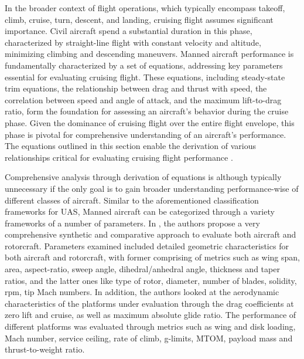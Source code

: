 \documentclass[english, 12pt, a4paper, elec, utf8, a-1b, online]{aaltothesis}
\begin{document}
In the broader context of flight operations, which typically encompass takeoff, climb, cruise, turn, descent, and landing, cruising flight assumes significant importance.
Civil aircraft spend a substantial duration in this phase, characterized by straight-line flight with constant velocity and altitude, minimizing climbing and descending maneuvers.
Manned aircraft performance is fundamentally characterized by a set of equations, addressing key parameters essential for evaluating cruising flight.
These equations, including steady-state trim equations, the relationship between drag and thrust with speed, the correlation between speed and angle of attack, and the maximum lift-to-drag ratio, form the foundation for assessing an aircraft's behavior during the cruise phase.
Given the dominance of cruising flight over the entire flight envelope, this phase is pivotal for comprehensive understanding of an aircraft's performance. The equations outlined in this section enable the derivation of various relationships critical for evaluating cruising flight performance \cite{sadraey2017ch5}.

Comprehensive analysis through derivation of equations is although typically unnecessary if the only goal is to gain broader understanding performance-wise of different classes of aircraft. Similar to the aforementioned classification frameworks for UAS, Manned aircraft can be categorized through a variety frameworks of a number of parameters. In \cite{filippone2000data}, the authors propose a very comprehensive synthetic and comparative approach to evaluate both aircraft and rotorcraft. Parameters examined included detailed geometric characteristics for both aircraft and rotorcraft, with former comprising of metrics such as wing span, area, aspect-ratio, sweep angle, dihedral/anhedral angle, thickness and taper ratios, and the latter ones like type of rotor, diameter, number of blades, solidity, rpm, tip Mach numbers. In addition, the authors looked at the aerodynamic characteristics of the platforms under evaluation through the drag coefficients at zero lift and cruise, as well as maximum absolute glide ratio. The performance of different platforms was evaluated through metrics such as wing and disk loading, Mach number, service ceiling, rate of climb, g-limits, MTOM, payload mass and thrust-to-weight ratio.

\end{document}
